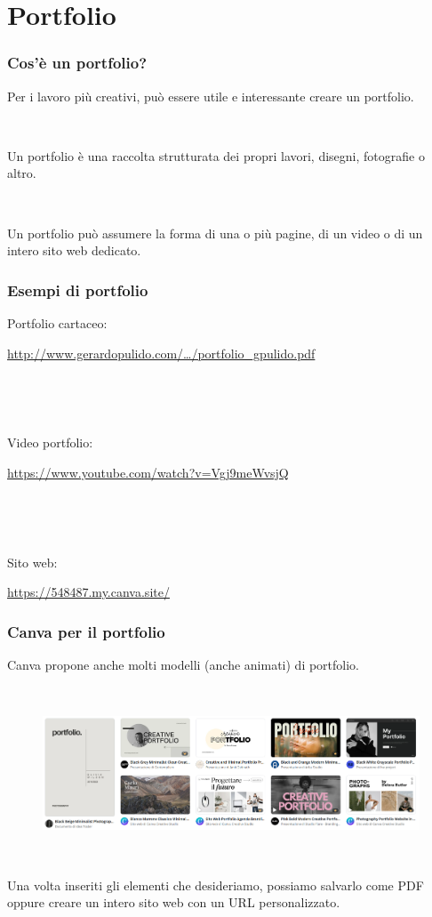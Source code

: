 \documentclass[handout]{beamer}
\begin{document}
\section{Portfolio}

\begin{frame}
\frametitle{Cos'è un portfolio?}
Per i lavoro più creativi, può essere utile e interessante creare un portfolio.\pause

~

Un portfolio è una \alert{raccolta strutturata} dei propri lavori, disegni, fotografie o altro.\pause

~

Un portfolio può assumere la forma di una o più pagine, di un video o di un intero sito web dedicato.
\end{frame}

\begin{frame}
\frametitle{Esempi di portfolio}
\begin{center}
  Portfolio cartaceo: 
  
  \href{http://www.gerardopulido.com/uploads/contenidos/portfolio_gpulido.pdf}{http://www.gerardopulido.com/\ldots/portfolio\_gpulido.pdf}

  ~

  ~

  Video portfolio:
  
  \href{https://www.youtube.com/watch?v=Vgj9meWvsjQ}{https://www.youtube.com/watch?v=Vgj9meWvsjQ}

  ~

  ~

  Sito web:
  
  \href{https://548487.my.canva.site/}{https://548487.my.canva.site/}
\end{center}
\end{frame}


\begin{frame}
\frametitle{Canva per il portfolio}
Canva propone anche molti modelli (anche animati) di portfolio.\pause

~

\begin{figure}
  \includegraphics[width=\columnwidth]{img/portfoliocanva.png}
\end{figure}

~

Una volta inseriti gli elementi che desideriamo, possiamo salvarlo come PDF oppure creare un intero sito web con un URL personalizzato.
\end{frame}
\end{document}
